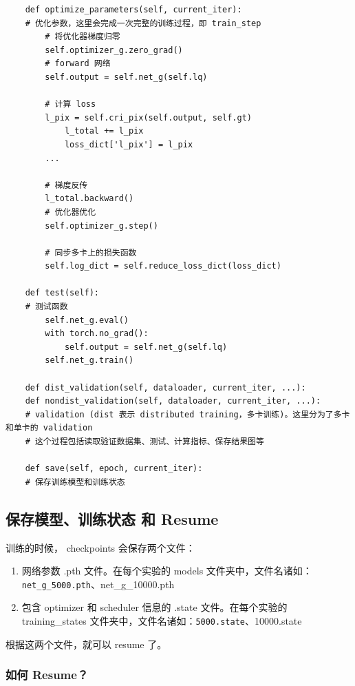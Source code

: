 \documentclass[../main.tex]{subfiles}
\begin{document}
\begin{verbatim}
    def optimize_parameters(self, current_iter):
    # 优化参数，这里会完成一次完整的训练过程，即 train_step
        # 将优化器梯度归零
        self.optimizer_g.zero_grad()
        # forward 网络
        self.output = self.net_g(self.lq)

        # 计算 loss
        l_pix = self.cri_pix(self.output, self.gt)
            l_total += l_pix
            loss_dict['l_pix'] = l_pix
        ...

        # 梯度反传
        l_total.backward()
        # 优化器优化
        self.optimizer_g.step()

        # 同步多卡上的损失函数
        self.log_dict = self.reduce_loss_dict(loss_dict)

    def test(self):
    # 测试函数
        self.net_g.eval()
        with torch.no_grad():
            self.output = self.net_g(self.lq)
        self.net_g.train()

    def dist_validation(self, dataloader, current_iter, ...):
    def nondist_validation(self, dataloader, current_iter, ...):
    # validation (dist 表示 distributed training，多卡训练)。这里分为了多卡和单卡的 validation
    # 这个过程包括读取验证数据集、测试、计算指标、保存结果图等

    def save(self, epoch, current_iter):
    # 保存训练模型和训练状态
\end{verbatim}

\subsection{保存模型、训练状态 和 Resume}\label{code_structure:save_resume}

训练的时候， checkpoints 会保存两个文件：
\begin{enumerate}
    \item 网络参数 .pth 文件。在每个实验的 models 文件夹中，文件名诸如：\texttt{net\_g\_5000.pth}、{net\_g\_10000.pth}
    \item 包含 optimizer 和 scheduler 信息的 .state 文件。在每个实验的 training\_states 文件夹中，文件名诸如：\texttt{5000.state}、{10000.state}
\end{enumerate}

根据这两个文件，就可以 resume 了。

\subsubsection{如何 Resume？}\label{code_structure:howto_resume}
\end{document}
